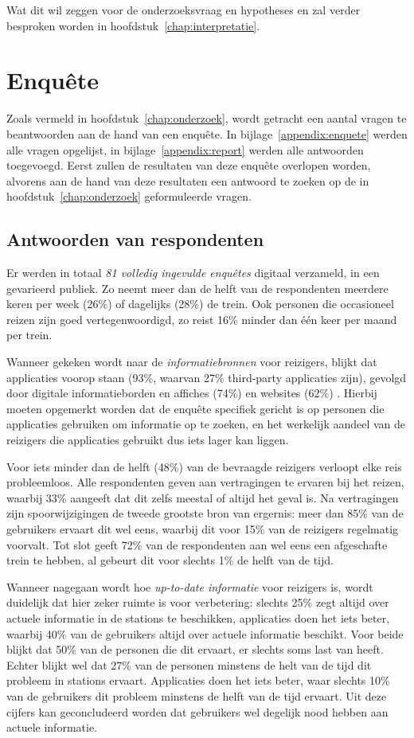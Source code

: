 Wat dit wil zeggen voor de onderzoeksvraag en hypotheses en zal verder besproken worden in hoofdstuk~\ref{chap:interpretatie}.

\section{Enquête}
Zoals vermeld in hoofdstuk~\ref{chap:onderzoek}, wordt getracht een aantal vragen te beantwoorden aan de hand van een enquête. In bijlage~\ref{appendix:enquete} werden alle vragen opgelijst, in bijlage~\ref{appendix:report} werden alle antwoorden toegevoegd. Eerst zullen de resultaten van deze enquête overlopen worden, alvorens aan de hand van deze resultaten een antwoord te zoeken op de in hoofdstuk~\ref{chap:onderzoek} geformuleerde vragen.

\subsection{Antwoorden van respondenten}
Er werden in totaal \emph{81 volledig ingevulde enquêtes} digitaal verzameld, in een gevarieerd publiek. Zo neemt meer dan de helft van de respondenten meerdere keren per week (26\%) of dagelijks (28\%) de trein. Ook personen die occasioneel reizen zijn goed vertegenwoordigd, zo reist 16\% minder dan één keer per maand per trein.

Wanneer gekeken wordt naar de \emph{informatiebronnen} voor reizigers, blijkt dat  applicaties voorop staan (93\%, waarvan 27\% third-party applicaties zijn), gevolgd door digitale informatieborden en affiches (74\%) en websites (62\%) . Hierbij moeten opgemerkt worden dat de enquête specifiek gericht is op personen die applicaties gebruiken om informatie op te zoeken, en het werkelijk aandeel van de reizigers die applicaties gebruikt dus iets lager kan liggen.

Voor iets minder dan de helft (48\%) van de bevraagde reizigers verloopt elke reis probleemloos. Alle respondenten geven aan vertragingen te ervaren bij het reizen, waarbij 33\% aangeeft dat dit zelfs meestal of altijd het geval is. Na vertragingen zijn spoorwijzigingen de tweede grootste bron van ergernis: meer dan 85\% van de gebruikers ervaart dit wel eens, waarbij dit voor 15\% van de reizigers regelmatig voorvalt. Tot slot geeft 72\% van de respondenten aan wel eens een afgeschafte trein te hebben, al gebeurt dit voor slechts 1\% de helft van de tijd.

Wanneer nagegaan wordt hoe \emph{up-to-date informatie} voor reizigers is, wordt duidelijk dat hier zeker ruimte is voor verbetering: slechts 25\% zegt altijd over actuele informatie in de stations te beschikken, applicaties doen het iets beter, waarbij 40\% van de gebruikers altijd over actuele informatie beschikt. Voor beide blijkt dat 50\% van de personen die dit ervaart, er slechts soms last van heeft. Echter blijkt wel dat 27\% van de personen minstens de helt van de tijd dit probleem in stations ervaart. Applicaties doen het iets beter, waar slechts 10\% van de gebruikers dit probleem minstens de helft van de tijd ervaart. Uit deze cijfers kan geconcludeerd worden dat gebruikers wel degelijk nood hebben aan actuele informatie. 

